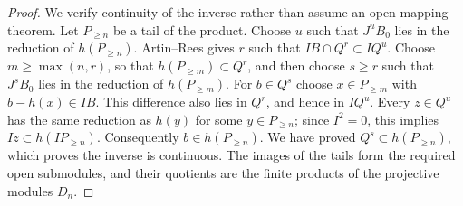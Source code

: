 \begin{proof}
We verify continuity of the inverse rather than assume an open
mapping theorem. Let $P_{\geq n}$ be a tail of the product. Choose
$u$ such that $J^uB_0$ lies in the reduction of
$h(P_{\geq n})$. Artin--Rees gives $r$ such that
$IB\cap Q^r\subset IQ^u$. Choose $m\geq\max(n,r)$, so that
$h(P_{\geq m})\subset Q^r$, and then choose $s\geq r$ such
that $J^sB_0$ lies in the reduction of $h(P_{\geq m})$.
For $b\in Q^s$ choose $x\in P_{\geq m}$ with
$b-h(x)\in IB$. This difference also lies in $Q^r$, and hence
in $IQ^u$. Every $z\in Q^u$ has the same reduction as
$h(y)$ for some $y\in P_{\geq n}$; since $I^2=0$, this implies
$Iz\subset h(IP_{\geq n})$. Consequently
$b\in h(P_{\geq n})$. We have proved
$Q^s\subset h(P_{\geq n})$, which proves the inverse is
continuous. The images of the tails form the required open
submodules, and their quotients are the finite products of the
projective modules $D_n$.
\end{proof}

